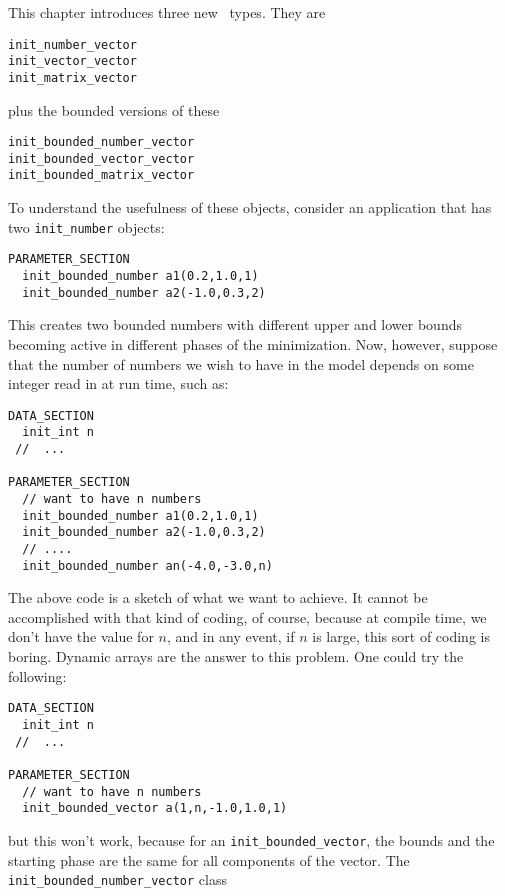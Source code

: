 %
%

This chapter introduces three new \ADM\ types. They are
\begin{lstlisting}
init_number_vector
init_vector_vector 
init_matrix_vector
\end{lstlisting}
plus the bounded versions of these
\begin{lstlisting}
init_bounded_number_vector
init_bounded_vector_vector 
init_bounded_matrix_vector
\end{lstlisting}
To understand the usefulness of these objects, consider an application
that has two \texttt{init\_number} objects:
\begin{lstlisting}
PARAMETER_SECTION
  init_bounded_number a1(0.2,1.0,1)
  init_bounded_number a2(-1.0,0.3,2)
\end{lstlisting} 
This creates two bounded numbers with different
upper and lower bounds becoming active in different phases
of the minimization.
Now, however, suppose that the number of numbers we wish to
have in the model depends on some integer read in at run time, such as:
\begin{lstlisting}
DATA_SECTION
  init_int n
 //  ...

PARAMETER_SECTION
  // want to have n numbers
  init_bounded_number a1(0.2,1.0,1)
  init_bounded_number a2(-1.0,0.3,2)
  // ....
  init_bounded_number an(-4.0,-3.0,n)
\end{lstlisting} 
The above code is a sketch of what we want to 
achieve. It cannot be accomplished with that kind of coding,
of course, because at compile time, we don't have the value for $n$,
and in any event, if $n$ is large, this sort of coding is boring.
Dynamic arrays are the answer to this problem. One could try
the following:
\begin{lstlisting}
DATA_SECTION
  init_int n
 //  ...

PARAMETER_SECTION
  // want to have n numbers
  init_bounded_vector a(1,n,-1.0,1.0,1)
\end{lstlisting} 
but this won't work, because for an \texttt{init\_bounded\_vector},
the bounds and the starting phase are the same for all components of
the vector. The \texttt{init\_bounded\_number\_vector} class
